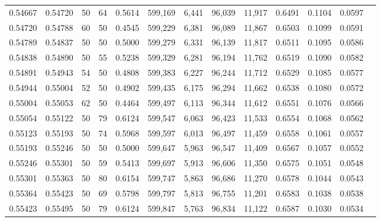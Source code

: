 \begin{tabular}{rrrrrrrrrrrrr}
0.54667 & 0.54720 &    50 &  64 &                                     0.5614 & 599,169 &   6,441 &  96,039 &  11,917 & 0.6491 & 0.1104 & 0.0597 \\
0.54720 & 0.54788 &    60 &  50 &                                     0.4545 & 599,229 &   6,381 &  96,089 &  11,867 & 0.6503 & 0.1099 & 0.0591 \\
0.54789 & 0.54837 &    50 &  50 &                                     0.5000 & 599,279 &   6,331 &  96,139 &  11,817 & 0.6511 & 0.1095 & 0.0586 \\
0.54838 & 0.54890 &    50 &  55 &                                     0.5238 & 599,329 &   6,281 &  96,194 &  11,762 & 0.6519 & 0.1090 & 0.0582 \\
0.54891 & 0.54943 &    54 &  50 &                                     0.4808 & 599,383 &   6,227 &  96,244 &  11,712 & 0.6529 & 0.1085 & 0.0577 \\
0.54944 & 0.55004 &    52 &  50 &                                     0.4902 & 599,435 &   6,175 &  96,294 &  11,662 & 0.6538 & 0.1080 & 0.0572 \\
0.55004 & 0.55053 &    62 &  50 &                                     0.4464 & 599,497 &   6,113 &  96,344 &  11,612 & 0.6551 & 0.1076 & 0.0566 \\
0.55054 & 0.55122 &    50 &  79 &                                     0.6124 & 599,547 &   6,063 &  96,423 &  11,533 & 0.6554 & 0.1068 & 0.0562 \\
0.55123 & 0.55193 &    50 &  74 &                                     0.5968 & 599,597 &   6,013 &  96,497 &  11,459 & 0.6558 & 0.1061 & 0.0557 \\
0.55193 & 0.55246 &    50 &  50 &                                     0.5000 & 599,647 &   5,963 &  96,547 &  11,409 & 0.6567 & 0.1057 & 0.0552 \\
0.55246 & 0.55301 &    50 &  59 &                                     0.5413 & 599,697 &   5,913 &  96,606 &  11,350 & 0.6575 & 0.1051 & 0.0548 \\
0.55301 & 0.55363 &    50 &  80 &                                     0.6154 & 599,747 &   5,863 &  96,686 &  11,270 & 0.6578 & 0.1044 & 0.0543 \\
0.55364 & 0.55423 &    50 &  69 &                                     0.5798 & 599,797 &   5,813 &  96,755 &  11,201 & 0.6583 & 0.1038 & 0.0538 \\
0.55423 & 0.55495 &    50 &  79 &                                     0.6124 & 599,847 &   5,763 &  96,834 &  11,122 & 0.6587 & 0.1030 & 0.0534 \\

\end{tabular}
